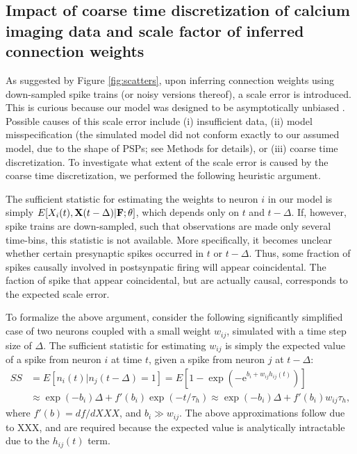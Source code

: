 \subsection{Impact of coarse time discretization of calcium imaging data and scale factor of inferred connection weights} \label{sec:scale}

As suggested by Figure \ref{fig:scatters}, upon inferring connection weights using down-sampled spike trains (or noisy versions thereof), a scale error is introduced. This is curious because our model was designed to be asymptotically unbiased \cite{PAN03d}. Possible causes of this scale error include (i) insufficient data,  (ii) model misspecification (the simulated model did not conform exactly to our assumed model, due to the shape of PSPs; see Methods for details), or (iii) coarse time discretization.  To investigate what extent of the scale error is caused by the coarse time discretization, we performed the following heuristic argument.

The sufficient statistic for estimating the weights to neuron $i$ in our model is simply $E[X_i(t), {\bf X} (t-\Delta)| {\bf F}; \mathbf{\theta}]$, which depends only on $t$ and $t-\Delta$.  If, however, spike trains are down-sampled, such that observations are made only several time-bins, this statistic is not available.  More specifically, it becomes unclear whether certain presynaptic spikes occurred in $t$ or $t-\Delta$.  Thus, some fraction of spikes causally involved in postsynpatic firing will appear coincidental.  The faction of spike that appear coincidental, but are actually causal, corresponds to the expected scale error.

To formalize the above argument, consider the following significantly simplified case of two neurons coupled with a small weight $w_{ij}$, simulated with a time step size of $\Delta$. The sufficient statistic for estimating $w_{ij}$ is simply the expected value of a spike from neuron $i$ at time $t$, given a spike from neuron $j$ at $t-\Delta$:
\begin{align} %
SS&=E\left[n_i(t) | n_j(t-\Delta)=1\right] %
=E\left[1-\exp\left(-\text{e}^{b_i+w_{ij}h_{ij}(t)}\right)\right]  \nonumber \\
&\approx \exp(-b_i) \Delta + f'(b_i) \exp(-t/\tau_h) %
\approx  \exp(-b_i) \Delta + f'(b_i) w_{ij}\tau_h, \label{eqn:SS}
\end{align}
where $f'(b)=df/dXXX$, and $b_i \gg w_{ij}$. The above approximations follow due to XXX, and are required because the expected value is analytically intractable due to the $h_{ij}(t)$ term. 

